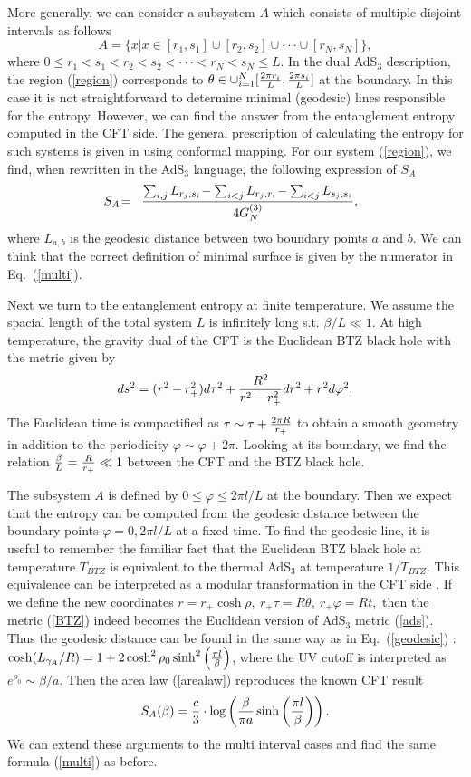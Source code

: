 \documentclass[twocolumn,amsmath,amssymb,nofootinbib,eqsecnum,tighten,prd]{revtex4}
\def\frac#1#2{{#1\over #2}}
\def\f {\frac}
\def\ddd{\cdot\cdot\cdot}
\def\vp{\varphi}
\def\frac#1#2{{#1\over #2}}
\def\be{\begin{equation}}
\def\ee{\end{equation}}
\begin{document}
More generally,  we can consider a subsystem $A$ which consists of
multiple disjoint intervals as follows
 \be A=\{x|x\in [r_1,s_1]\cup [r_2,s_2]\cup \ddd \cup
[r_{N},s_{N}]\}, \label{region}
\ee
where $0\leq r_1<s_1<r_2< s_2<
\ddd < r_N<s_N\leq L$.  In the dual AdS$_3$ description,
the region (\ref{region})
corresponds to $\theta\in \cup_{i=1}^N[\frac{2\pi
r_i}{L},\frac{2\pi s_i}{L}]$ at the boundary. In this case it is not
straightforward to determine minimal (geodesic) lines responsible for the entropy.
However, we can find the answer from the entanglement entropy
computed in the CFT side.
 The general prescription of calculating
the entropy for such systems
is
given in \cite{Calabrese04}
using conformal mapping.
For our system (\ref{region}),
we find,
when rewritten in the AdS$_3$ language,
 the following expression of $S_A$
\begin{eqnarray}
S_A\!&=&\!\frac{
\sum_{i,j}L_{r_j,s_i}\!
-\sum_{i<j}L_{r_j,r_i}\!
-\sum_{i<j}L_{s_j,s_i}}{4G^{(3)}_N},~~ \label{multi}
\end{eqnarray}
where $L_{a,b}$ is the geodesic distance
between two boundary points $a$ and $b$.
We can think that the correct definition of minimal surface is given by the numerator
in Eq.\ (\ref{multi}).

Next we turn to the entanglement entropy at finite temperature.
We assume the spacial length of the total system $L$ is
infinitely long s.t. $\beta/L \ll 1$.
At high temperature, the gravity dual of the CFT is
the Euclidean BTZ black hole \cite{BTZ}
with the metric given by
\be
ds^2=(r^2-r_+^2)d\tau^2+ \f{R^2}{r^2-r^2_{+}}dr^2+r^2
d\vp^2. \label{BTZ}
\ee
The Euclidean time is compactified as $\tau\sim\tau+\f{2\pi
R}{r_+}$ to obtain a smooth geometry in addition to the periodicity
$\vp\sim \vp+2\pi$. Looking at its boundary, we
find the relation $\f{\beta}{L}=\f{R}{r_{+}}\ll 1$
between the CFT and the BTZ black hole.

The subsystem $A$ is defined by $0\leq \vp\leq 2\pi l/L$ at the
boundary. Then we expect
that the entropy can be computed from the geodesic distance
between the boundary points $\vp=0, 2\pi l/L$  at a fixed time. To find
the geodesic line, it is useful to remember the familiar fact that the
Euclidean BTZ black hole at temperature $T_{BTZ}$ is equivalent to the thermal
AdS$_3$ at temperature $1/T_{BTZ}$. This equivalence can be interpreted as
a modular transformation in the CFT side \cite{MS}. If we define the new
coordinates $r=r_{+}\cosh\rho,\
r_+\tau=R\theta,\  r_+\vp=Rt, $
then the metric  (\ref{BTZ})  indeed becomes the Euclidean version of AdS$_3$  metric
(\ref{ads}).
Thus the geodesic distance can be found in the same way
as in Eq.\ (\ref{geodesic}) : $\cosh(L_{\gamma_A}/R)
=1+2\cosh^2\rho_0\sinh^2\left(\f{\pi l}{\beta}\right)$,
where the UV cutoff is interpreted as $e^{\rho_0}\sim \beta/a$.
Then the area law
(\ref{arealaw}) reproduces the known CFT result \cite{Calabrese04}
\be
S_{A}(\beta)=\f{c}{3}\cdot\log\left(\f{\beta}{\pi a}\sinh\left(\f{\pi l}{
 \beta}\right)\right). \ee
We can extend these arguments to the multi interval cases and find the same
formula (\ref{multi}) as before.
\end{document}
